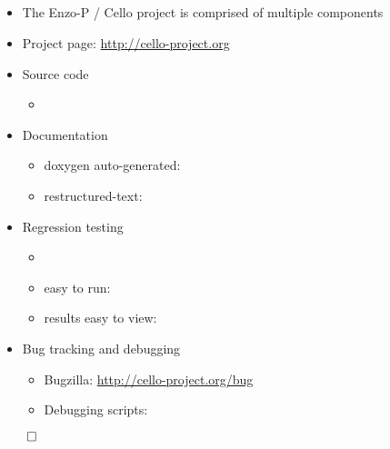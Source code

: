 \NEWSEC

\subsection{\ssProjectSummary}


\begin{frame}[fragile,label=ss-project-summary] 
\secframetitle{\ssProjectSummary}
\begin{itemize}
\item The Enzo-P / Cello project is comprised of multiple components
\item Project page: \url{http://cello-project.org}
\item Source code
\begin{itemize}
\item  {}
\end{itemize}
\item Documentation
\begin{itemize}
\item doxygen auto-generated:  
\item restructured-text: 
\end{itemize}
\item Regression testing
\begin{itemize}
\item  {}
\item easy to run: 
\item results easy to view: 
\end{itemize}
\item Bug tracking and debugging
\begin{itemize}
\item Bugzilla: \url{http://cello-project.org/bug}
\item Debugging scripts: 
\end{itemize}
\end{itemize}
\vfill
\centerline{$\qed$}
\end{frame}

